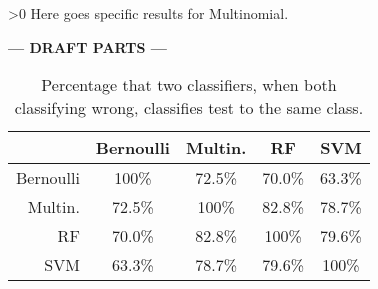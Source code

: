 \ifnum\printdraft>0
	Here goes specific results for Multinomial.
\else
\begin{center}
  	\textbf{--- DRAFT PARTS ---}
\end{center}
\fi

\begin{table}[h]\footnotesize
	\caption{Percentage that two classifiers, when both classifying wrong, classifies test to the same class.}
	\begin{tabular}{r|cccc}
	\ 		 	& Bernoulli & Multin. 	&RF 		&SVM \\ \hline
	Bernoulli 	&100\%   	&72.5\%   	&70.0\%   	&63.3\%\\
	Multin. 	&72.5\%  	&100\%   	&82.8\%   	&78.7\%\\
	RF 			&70.0\%   	&82.8\%  	&100\%   	&79.6\%\\
	SVM 		&63.3\%   	&78.7\%   	&79.6\%  	&100\%
	\end{tabular}
	\label{tab:similarity}
\end{table}
